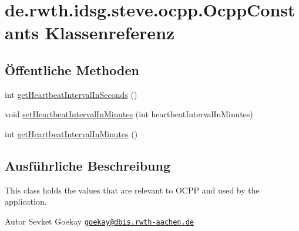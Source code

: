 \hypertarget{classde_1_1rwth_1_1idsg_1_1steve_1_1ocpp_1_1_ocpp_constants}{\section{de.\-rwth.\-idsg.\-steve.\-ocpp.\-Ocpp\-Constants Klassenreferenz}
\label{classde_1_1rwth_1_1idsg_1_1steve_1_1ocpp_1_1_ocpp_constants}
}
\subsection*{Öffentliche Methoden}
\begin{DoxyCompactItemize}
\item 
int \hyperlink{classde_1_1rwth_1_1idsg_1_1steve_1_1ocpp_1_1_ocpp_constants_a369cc157b41930db164e95a8594320d6}{get\-Heartbeat\-Interval\-In\-Seconds} ()
\item 
void \hyperlink{classde_1_1rwth_1_1idsg_1_1steve_1_1ocpp_1_1_ocpp_constants_aefb5fb70ca0c79f1ffbfccede3c1d995}{set\-Heartbeat\-Interval\-In\-Minutes} (int heartbeat\-Interval\-In\-Minutes)
\item 
int \hyperlink{classde_1_1rwth_1_1idsg_1_1steve_1_1ocpp_1_1_ocpp_constants_a2da8ca245023a953357d3c6ca8f8f3b0}{get\-Heartbeat\-Interval\-In\-Minutes} ()
\end{DoxyCompactItemize}


\subsection{Ausführliche Beschreibung}
This class holds the values that are relevant to O\-C\-P\-P and used by the application.

\begin{DoxyAuthor}{Autor}
Sevket Goekay \href{mailto:goekay@dbis.rwth-aachen.de}{\tt goekay@dbis.\-rwth-\/aachen.\-de} 
\end{DoxyAuthor}


